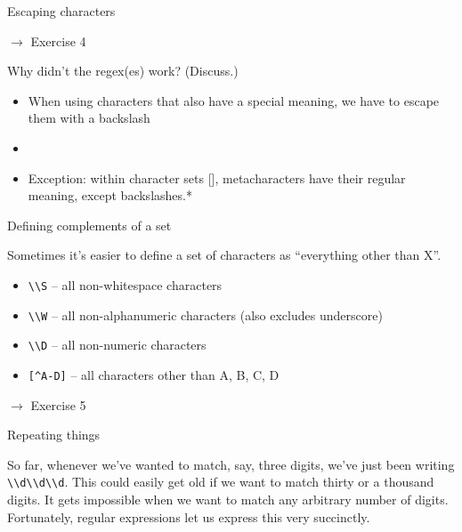 \documentclass{beamer}
\begin{document}
\verbdef{\specialchartext}{\^ \$ \. \\}

\begin{frame}{Escaping characters}

$\rightarrow$ Exercise 4

\bigskip

Why didn't the regex(es) work? (Discuss.)

\begin{itemize}
 \item When using characters that also have a special meaning, we have to escape them with a backslash
 \item \specialchartext
 \item Exception: within character sets [], metacharacters have their regular meaning, except backslashes.*
\end{itemize}

\end{frame}

\begin{frame}{Defining complements of a set}

Sometimes it's easier to define a set of characters as ``everything other than X''.

\begin{itemize}
  \item \lstinline$\\S$ -- all non-whitespace characters
  \item \lstinline$\\W$ -- all non-alphanumeric characters (also excludes underscore)
  \item \lstinline$\\D$ -- all non-numeric characters
  \item \lstinline$[^A-D]$ -- all characters other than A, B, C, D
\end{itemize}

\bigskip
$\rightarrow$ Exercise 5

\end{frame}

\begin{frame}{Repeating things}

So far, whenever we've wanted to match, say, three digits, we've just been writing
\lstinline$\\d\\d\\d$. This could easily get old if we want to match thirty or a thousand digits.
It gets impossible when we want to match any arbitrary number of digits.
Fortunately, regular expressions let us express this very succinctly.

\end{frame}
\end{document}
